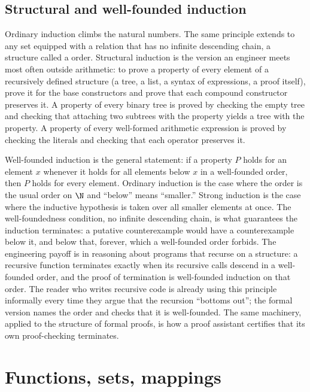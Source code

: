 \subsection{Structural and well-founded induction}

Ordinary induction climbs the natural numbers. The same principle
extends to any set equipped with a relation that has no infinite
descending chain, a structure called a  order.
Structural induction is the version an engineer meets most often
outside arithmetic: to prove a property of every element of a
recursively defined structure (a tree, a list, a syntax of
expressions, a proof itself), prove it for the base constructors and
prove that each compound constructor preserves it. A property of every
binary tree is proved by checking the empty tree and checking that
attaching two subtrees with the property yields a tree with the
property. A property of every well-formed arithmetic expression is
proved by checking the literals and checking that each operator
preserves it.

\begin{mastery}
Well-founded induction is the general statement: if a property $P$
holds for an element $x$ whenever it holds for all elements below $x$
in a well-founded order, then $P$ holds for every element. Ordinary
induction is the case where the order is the usual order on $\N$ and
``below'' means ``smaller.'' Strong induction is the case where the
inductive hypothesis is taken over all smaller elements at once. The
well-foundedness condition, no infinite descending chain, is what
guarantees the induction terminates: a putative counterexample would
have a counterexample below it, and below that, forever, which a
well-founded order forbids. The engineering payoff is in reasoning
about programs that recurse on a structure: a recursive function
terminates exactly when its recursive calls descend in a well-founded
order, and the proof of termination is well-founded induction on that
order. The reader who writes recursive code is already using this
principle informally every time they argue that the recursion
``bottoms out''; the formal version names the order and checks that it
is well-founded. The same machinery, applied to the structure of
formal proofs, is how a proof assistant certifies that its own
proof-checking terminates.
\end{mastery}

\section{Functions, sets, mappings}

